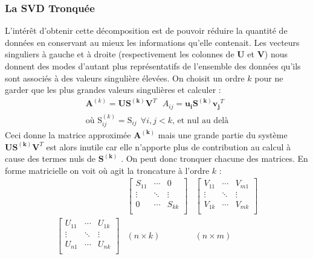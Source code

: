 \documentclass[12pt,a4paper]{report}
\begin{document}
\subsubsection{La SVD Tronquée}
L'intérêt d'obtenir cette décomposition est de pouvoir réduire la quantité de données en conservant au mieux les informations qu'elle contenait. Les vecteurs singuliers à gauche et à droite (respectivement les colonnes de $\mathbf{U}$ et $\mathbf{V}$) nous donnent des modes d'autant plus représentatifs de l'ensemble des données qu'ils sont associés à des valeurs singulière élevées. On choisit un ordre $k$ pour ne garder que les plus grandes valeurs singulières et calculer :
\begin{equation}
\begin{array}{c}
\mathbf{A}^{(k)} = \mathbf{U} \mathbf{S^{(k)}} \mathbf{V}^T
~~~A_{ij} = \mathbf{u_i} \mathbf{S^{(k)}} \mathbf{v_j}^T
\\
\text{où } \text{S}^{(k)}_{ij} = \text{S}_{ij} ~~ \forall i,j < k \text{, et nul au delà}
\end{array}
\end{equation}
Ceci donne la matrice approximée $\mathbf{A^{(k)}}$ mais une grande partie du système $\mathbf{U} \mathbf{S^{(k)}} \mathbf{V}^T$ est alors inutile car elle n'apporte plus de contribution au calcul à cause des termes nuls de $\mathbf{S^{(k)}}$ . On peut donc tronquer chacune des matrices. En forme matricielle on voit où agit la troncature à l'ordre $k$ :
\begin{equation}
\begin{matrix}
	&
	\begin{bmatrix}
	   S_{11} &\cdots& 0 \\
	   \vdots &\ddots& \vdots \\
	   0 &\cdots& S_{kk} \\
	\end{bmatrix}
	&
	\begin{bmatrix}
	   V_{11} &\cdots& V_{m1} \\
	   \vdots &\ddots& \vdots \\
	   V_{1k} &\cdots& V_{mk} \\
	\end{bmatrix}
\\
	\begin{bmatrix}
	   U_{11} &\cdots& U_{1k} \\
	   \vdots &\ddots& \vdots \\
	   U_{n1} &\cdots& U_{nk} \\
	\end{bmatrix}
	&
	(n \times k) 
	&
	(n \times m)
\end{matrix}
\end{equation}
\end{document}
